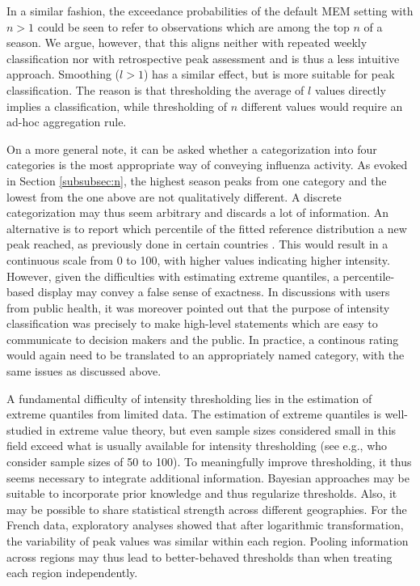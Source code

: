 \documentclass[12pt]{article}
\begin{document}
In a similar fashion, the exceedance probabilities of the default MEM setting with $n > 1$ could be seen to refer to observations which are among the top $n$ of a season. We argue, however, that this aligns neither with repeated weekly classification nor with retrospective peak assessment and is thus a less intuitive approach. Smoothing ($l > 1$) has a similar effect, but is more suitable for peak classification. The reason is that thresholding the average of $l$ values directly implies a classification, while thresholding of $n$ different values would require an ad-hoc aggregation rule.

On a more general note, it can be asked whether a categorization into four categories is the most appropriate way of conveying influenza activity. As evoked in Section \ref{subsubsec:n}, the highest season peaks from one category and the lowest from the one above are not qualitatively different. A discrete categorization may thus seem arbitrary and discards a lot of information. An alternative is to report which percentile of the fitted reference distribution a new peak reached, as previously done in certain countries \citep{Green2015}. This would result in a continuous scale from 0 to 100, with higher values indicating higher intensity. However, given the difficulties with estimating extreme quantiles, a percentile-based display may convey a false sense of exactness. In discussions with users from public health, it was moreover pointed out that the purpose of intensity classification was precisely to make high-level statements which are easy to communicate to decision makers and the public. In practice, a continous rating would again need to be translated to an appropriately named category, with the same issues as discussed above.

A fundamental difficulty of intensity thresholding lies in the estimation of extreme quantiles from limited data. The estimation of extreme quantiles is well-studied in extreme value theory, but even sample sizes considered small in this field exceed what is usually available for intensity thresholding (see e.g., \citealt{Pisarenko2017} who consider sample sizes of 50 to 100). To meaningfully improve thresholding, it thus seems necessary to integrate additional information. Bayesian approaches may be suitable to incorporate prior knowledge and thus regularize thresholds. Also, it may be possible to share statistical strength across different geographies. For the French data, exploratory analyses showed that after logarithmic transformation, the variability of peak values was similar within each region. Pooling information across regions may thus lead to better-behaved thresholds than when treating each region independently.
\end{document}
